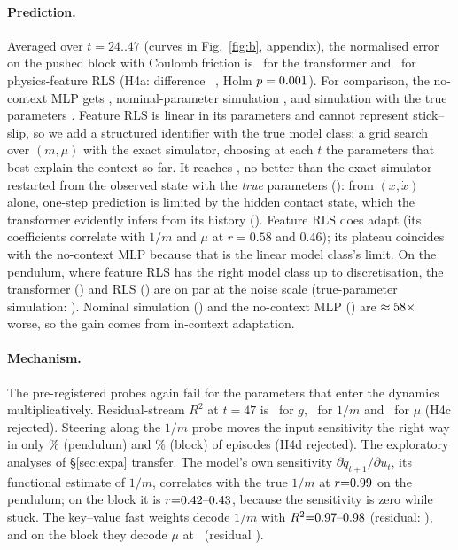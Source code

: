 \paragraph{Prediction.} Averaged over $t{=}24..47$ (curves in Fig.~\ref{fig:b}, appendix), the normalised error on the pushed block with Coulomb friction is
\BKTF\ for the transformer and \BKRLS\ for physics-feature RLS (H4a: difference \HfourA\ \HfourAci, Holm $p=0.001$).
For comparison, the no-context MLP gets \BKMLP, nominal-parameter simulation \BKNom, and simulation with the true parameters
\BKOrc. Feature RLS is linear in its parameters and cannot represent stick--slip, so we add a structured identifier
with the true model class: a grid search over $(m,\mu)$ with the exact simulator, choosing at each $t$ the parameters
that best explain the context so far. It reaches \BKSys, no better than the exact simulator restarted from the observed state with the \emph{true}
parameters (\BKOrcObs): from $(x,\dot x)$ alone, one-step prediction is limited by the hidden contact state, which the
transformer evidently infers from its history (\BKTF). Feature RLS does adapt (its coefficients correlate with $1/m$
and $\mu$ at $r{=}0.58$ and $0.46$); its plateau coincides with the no-context MLP because that is the linear model class's limit. On the pendulum, where feature RLS has the right model class up to discretisation, the transformer
(\BPTF) and RLS (\BPRLS) are on par at the noise scale (true-parameter simulation: \BPOrc). Nominal simulation (\BPNom) and the no-context MLP (\BPMLP) are $\approx58\times$ worse,
so the gain comes from in-context adaptation.

\paragraph{Mechanism.} The pre-registered probes again fail for the parameters that enter the dynamics
multiplicatively. Residual-stream $R^2$ at $t{=}47$ is \BprobePg\ for $g$, \BprobePinvm\ for $1/m$ and \BprobeKmu\ for
$\mu$ (H4c rejected). Steering along the $1/m$ probe moves the input sensitivity the right way in only
\BsteerP\% (pendulum) and \BsteerK\% (block) of episodes (H4d rejected). The exploratory analyses of \S\ref{sec:expa}
transfer. The model's own sensitivity $\partial\dot q_{t+1}/\partial u_t$, its functional estimate of $1/m$, correlates
with the true $1/m$ at $r{=}0.99$ on the pendulum; on the block it is $r{=}0.42\mbox{--}0.43$, because the sensitivity is zero while stuck. The
key--value fast weights decode $1/m$ with $R^2{=}0.97\mbox{--}0.98$ (residual: \BresPinvm), and on the block they decode $\mu$ at \BfwKmu\ (residual
\BresKmu). 

